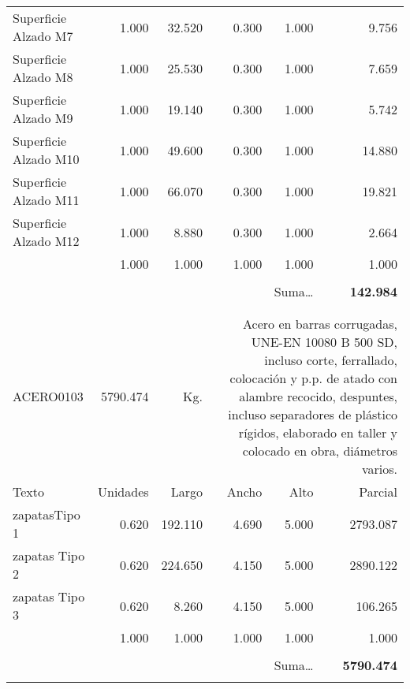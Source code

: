 \documentclass{book}%
\begin{document}
\begin{longtable}{lrrrrr}
\multicolumn{1}{p{3.5cm}}{Superficie Alzado M7}&1.000&32.520&0.300&1.000&9.756\\%
\multicolumn{1}{p{3.5cm}}{Superficie Alzado M8}&1.000&25.530&0.300&1.000&7.659\\%
\multicolumn{1}{p{3.5cm}}{Superficie Alzado M9}&1.000&19.140&0.300&1.000&5.742\\%
\multicolumn{1}{p{3.5cm}}{Superficie Alzado M10}&1.000&49.600&0.300&1.000&14.880\\%
\multicolumn{1}{p{3.5cm}}{Superficie Alzado M11}&1.000&66.070&0.300&1.000&19.821\\%
\multicolumn{1}{p{3.5cm}}{Superficie Alzado M12}&1.000&8.880&0.300&1.000&2.664\\%
\multicolumn{1}{p{3.5cm}}{}&1.000&1.000&1.000&1.000&1.000\\%
&&&&&\\%
\multicolumn{5}{r}{Suma\ldots}&\textbf{142.984}\\%
\hline%
&&&&&\\%
&&&&&\\%
ACERO0103&5790.474& Kg.&\multicolumn{3}{p{6cm}}{\scriptsize Acero en barras corrugadas, UNE-EN 10080 B 500 SD, incluso corte, ferrallado, colocación y p.p. de atado con alambre recocido, despuntes, incluso separadores de plástico rígidos, elaborado en taller y colocado en obra, diámetros varios.\normalsize}\\%
Texto&Unidades&Largo&Ancho&Alto&Parcial\\%
\hline%
\multicolumn{1}{p{3.5cm}}{ zapatasTipo 1}&0.620&192.110&4.690&5.000&2793.087\\%
\multicolumn{1}{p{3.5cm}}{ zapatas Tipo 2}&0.620&224.650&4.150&5.000&2890.122\\%
\multicolumn{1}{p{3.5cm}}{ zapatas Tipo 3 }&0.620&8.260&4.150&5.000&106.265\\%
\multicolumn{1}{p{3.5cm}}{}&1.000&1.000&1.000&1.000&1.000\\%
&&&&&\\%
\multicolumn{5}{r}{Suma\ldots}&\textbf{5790.474}\\%
\hline%
&&&&&\\%
\end{longtable}%
\newpage

%
\end{document}
